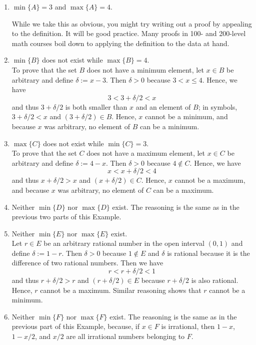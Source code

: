 \begin{enumerate}
\renewcommand{\labelenumi}{(\alph{enumi})}
\setlength{\itemsep}{.2cm}
    \item  \Ans $\min\{A\} = 3$ and  $\max\{A\} = 4$.
    
    While we take this as obvious, you might try writing out a proof by appealing to the definition. It will be good practice. Many proofs in 100- and 200-level math courses boil down to applying the definition to the data at hand.

    \item  \Ans $\min\{B\}$ does not exist while $\max\{B\} = 4$. \\
    
    To prove that the set $B$ does not have a minimum element, let $x \in B$ be arbitrary and define $\delta:=x-3$. Then $\delta >0$ because $3 < x \le 4$. Hence, we have 
    $$3 <  3+\delta/2 < x $$
    and thus $3+\delta/2$ is both smaller than $x$ and an element of $B$; in symbols, $3+\delta/2 < x $ and $(3+\delta/2) \in B$. Hence, $x$ cannot be a minimum, and because $x$ was arbitrary, no element of $B$ can be a minimum.

    \item  \Ans $\max\{C\}$ does not exist while $\min\{C\} = 3$. \\
    
    To prove that the set $C$ does not have a maximum element, let $x \in C$ be arbitrary and define $\delta:=4-x$. Then $\delta >0$ because $4 \notin C$. Hence, we have 
    $$ x < x+\delta/2 < 4 $$
    and thus $x+\delta/2  > x $ and $(x+\delta/2 ) \in C$. Hence, $x$ cannot be a maximum, and because $x$ was arbitrary, no element of $C$ can be a maximum.

    \item \Ans Neither  $\min\{D\}$ nor  $\max\{D\}$ exist. The reasoning is the same as in the previous two parts of this Example.

    \item \Ans Neither  $\min\{E\}$ nor  $\max\{E\}$ exist. \\
    
    Let $r \in E$ be an arbitrary rational number in the open interval $(0, 1)$ and define $\delta:=1-r$. Then $\delta >0$ because $1 \notin E$ and $\delta$ is rational because it is the difference of two rational numbers. Then we have 
    $$ r < r+\delta/2 < 1 $$
    and thus $r+\delta/2   > r$ and $(r+\delta/2  ) \in E$ because $r+\delta/2$ is also rational. Hence, $r$ cannot be a maximum. Similar reasoning shows that $r$ cannot be a minimum.
    
    \item \Ans Neither  $\min\{F\}$ nor  $\max\{F\}$ exist. The reasoning is the same as in the previous part of this Example, because, if $x\in F$ is irrational, then $1-x$, $1-x/2$, and $x/2$ are all irrational numbers belonging to $F$. 
    
\end{enumerate}

